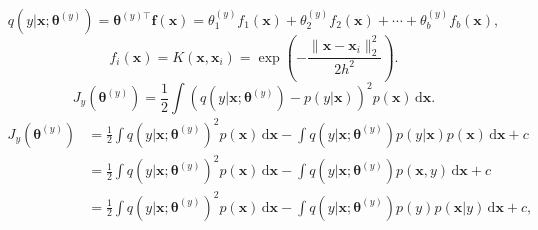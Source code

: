 \begin{equation}\label{eq:classification-basis-model}
q(y|\boldsymbol{x};\boldsymbol{\theta}^{(y)})=\boldsymbol{\theta}^{(y)\top}\boldsymbol{f}(\boldsymbol{x})=\theta_1^{(y)}f_1(\boldsymbol{x})+\theta_2^{(y)}f_2(\boldsymbol{x})+\cdots+\theta_b^{(y)}f_b(\boldsymbol{x}),
\end{equation}
\begin{equation}\label{eq:classification-gaussian-kernel}
f_i(\boldsymbol{x})=K(\boldsymbol{x},\boldsymbol{x}_i)=\exp\left(-\frac{\|\boldsymbol{x}-\boldsymbol{x}_i\|_2^2}{2h^2}\right).
\end{equation}
\[J_y(\boldsymbol{\theta}^{(y)})=\frac12\int\left(q(y|\boldsymbol{x};\boldsymbol{\theta}^{(y)})-p(y|\boldsymbol{x})\right)^2p(\boldsymbol{x})\,\mathrm d\boldsymbol{x}.\]
\begin{equation}\label{eq:classification-integral-loss}
\begin{aligned}
J_y(\boldsymbol{\theta}^{(y)})&=\frac12\int q(y|\boldsymbol{x};\boldsymbol{\theta}^{(y)})^2p(\boldsymbol{x})\,\mathrm d\boldsymbol{x}-\int q(y|\boldsymbol{x};\boldsymbol{\theta}^{(y)})p(y|\boldsymbol{x})p(\boldsymbol{x})\,\mathrm d\boldsymbol{x}+c\\
&=\frac12\int q(y|\boldsymbol{x};\boldsymbol{\theta}^{(y)})^2p(\boldsymbol{x})\,\mathrm d\boldsymbol{x}-\int q(y|\boldsymbol{x};\boldsymbol{\theta}^{(y)})p(\boldsymbol{x},y)\,\mathrm d\boldsymbol{x}+c\\
&=\frac12\int q(y|\boldsymbol{x};\boldsymbol{\theta}^{(y)})^2p(\boldsymbol{x})\,\mathrm d\boldsymbol{x}-\int q(y|\boldsymbol{x};\boldsymbol{\theta}^{(y)})p(y)p(\boldsymbol{x}|y)\,\mathrm d\boldsymbol{x}+c,
\end{aligned}
\end{equation}
